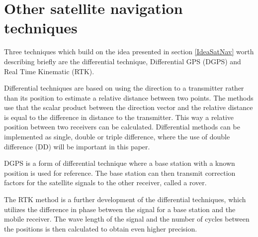\section{Other satellite navigation techniques}\label{DGPSRTK}
Three techniques which build on the idea presented in section \ref{IdeaSatNav} worth describing briefly are the differential technique, Differential GPS (DGPS) and Real Time Kinematic (RTK). 
\par
Differential techniques are based on using the direction to a transmitter rather than its position to estimate a relative distance between two points. The methods use that the scalar product between the direction vector and the relative distance is equal to the difference in distance to the transmitter. This way a relative position between two receivers can be calculated. Differential methods can be implemented as single, double or triple difference, where the use of double difference (DD) will be important in this paper. 
\par 
DGPS is a form of differential technique where a base station with a known position is used for reference. The base station can then transmit correction factors for the satellite signals to the other receiver, called a rover.
\par
The RTK method is a further development of the differential techniques, which utilizes the difference in phase between the signal for a base station and the mobile receiver. The wave length of the signal and the number of cycles between the positions is then calculated to obtain even higher precision.

